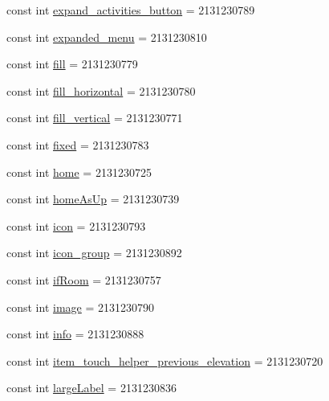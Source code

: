 \begin{CompactItemize}
\item 
const int \hyperlink{class__2doo_1_1_droid_1_1_resource_1_1_id_da9a9b988c0f2b80f9094615d2dd1ed0}{expand\_\-activities\_\-button} = 2131230789
\item 
const int \hyperlink{class__2doo_1_1_droid_1_1_resource_1_1_id_34af6713dbe482e9e555fea594c496a3}{expanded\_\-menu} = 2131230810
\item 
const int \hyperlink{class__2doo_1_1_droid_1_1_resource_1_1_id_563cccddb45e9f559e130c819768a2a9}{fill} = 2131230779
\item 
const int \hyperlink{class__2doo_1_1_droid_1_1_resource_1_1_id_f26fdf4881b6a1e76833e9dc848a33d6}{fill\_\-horizontal} = 2131230780
\item 
const int \hyperlink{class__2doo_1_1_droid_1_1_resource_1_1_id_74b4c33dc78816d59c5291ae5ca750f4}{fill\_\-vertical} = 2131230771
\item 
const int \hyperlink{class__2doo_1_1_droid_1_1_resource_1_1_id_e0133de08db320a62abc634271398b22}{fixed} = 2131230783
\item 
const int \hyperlink{class__2doo_1_1_droid_1_1_resource_1_1_id_34d6ce5d979371e564f3a8c74f7b5336}{home} = 2131230725
\item 
const int \hyperlink{class__2doo_1_1_droid_1_1_resource_1_1_id_578c6f3040008bca2baa034ab1aac82c}{homeAsUp} = 2131230739
\item 
const int \hyperlink{class__2doo_1_1_droid_1_1_resource_1_1_id_a332f7f0bcdade9bb195d6ec49fec777}{icon} = 2131230793
\item 
const int \hyperlink{class__2doo_1_1_droid_1_1_resource_1_1_id_c6b511946199513303ef34d42a62ec86}{icon\_\-group} = 2131230892
\item 
const int \hyperlink{class__2doo_1_1_droid_1_1_resource_1_1_id_8c6bd72edf0801ec19bcd0910d2c5613}{ifRoom} = 2131230757
\item 
const int \hyperlink{class__2doo_1_1_droid_1_1_resource_1_1_id_26a92b40ba9c38bd78e1ac401edd61e2}{image} = 2131230790
\item 
const int \hyperlink{class__2doo_1_1_droid_1_1_resource_1_1_id_0f7758ac040b9807d4a7215c215cf303}{info} = 2131230888
\item 
const int \hyperlink{class__2doo_1_1_droid_1_1_resource_1_1_id_c5d9f3097ed859e11e64efa42656fff1}{item\_\-touch\_\-helper\_\-previous\_\-elevation} = 2131230720
\item 
const int \hyperlink{class__2doo_1_1_droid_1_1_resource_1_1_id_1ae8b98f0cd82ff24670b0916b4ceeca}{largeLabel} = 2131230836
\item 

\end{CompactItemize}
